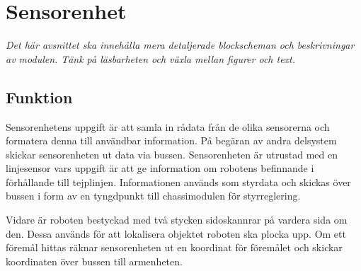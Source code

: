 \section{Sensorenhet}
\emph{Det här avsnittet ska innehålla mera detaljerade blockscheman och beskrivningar av modulen.
Tänk på läsbarheten och växla mellan figurer och text.}

\subsection{Funktion}
Sensorenhetens uppgift är att samla in rådata från de olika sensorerna och formatera denna till användbar information. På begäran av andra delsystem skickar sensorenheten ut data via bussen. Sensorenheten är utrustad
med en linjesensor vars uppgift är att ge information om robotens befinnande i förhållande till tejplinjen. Informationen används som styrdata och skickas över bussen i form av en tyngdpunkt till chassimodulen för styrreglering.

Vidare är roboten bestyckad med två stycken sidoskannrar på vardera sida om den. Dessa används för att lokalisera objektet roboten ska plocka upp. Om ett föremål hittas räknar sensorenheten ut en koordinat för föremålet och skickar koordinaten över bussen till armenheten.

